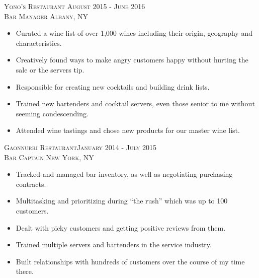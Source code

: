 \documentclass[oneside, final]{scrartcl}
\begin{document}
\begin{center}
\textsc{Yono's Restaurant \hfill August 2015 - June 2016 \\}
\textsc{Bar Manager \hfill Albany, NY\\}
\begin{itemize}
	\setlength{\itemsep}{1pt}
	\setlength{\parskip}{0pt}
	\setlength{\parsep}{0pt}
	\setlength{\leftmargin}{-5mm}
    \item Curated a wine list of over 1,000 wines including their origin, geography and characteristics.
    \item Creatively found ways to make angry customers happy without hurting the sale or the servers tip.
    \item Responsible for creating new cocktails and building drink lists.
    \item Trained new bartenders and cocktail servers, even those senior to me without seeming condescending.
    \item Attended wine tastings and chose new products for our master wine list.
\end{itemize}

\textsc{Gaonnurri Restaurant\hfill January 2014 - July 2015\\}
\textsc{Bar Captain \hfill New York, NY\\}
\begin{itemize}
	\setlength{\itemsep}{1pt}
	\setlength{\parskip}{0pt}
	\setlength{\parsep}{0pt}
	\setlength{\leftmargin}{-5mm}
    \item Tracked and managed bar inventory, as well as negotiating purchasing contracts.
    \item Multitasking and prioritizing during ``the rush'' which was up to 100 customers.
    \item Dealt with picky customers and getting positive reviews from them.
    \item Trained multiple servers and bartenders in the service industry.
    \item Built relationships with hundreds of customers over the course of my time there.

\end{itemize}


\begin{comment}
\section{Education}
Guilderland High School\hfill 2004 - 2008\\
High School Diploma\hfill Albany, NY\\
\end{comment}


\end{center}
\end{document}

